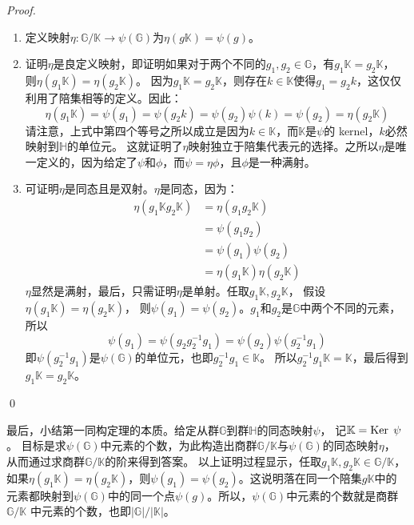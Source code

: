 \begin{proof}
		\begin{enumerate}
		\item 定义映射$\eta\colon \mathbb{G}/\mathbb{K} \to \psi(\mathbb{G})$为$\eta(g \mathbb{K}) = \psi(g)$。
		
		\item 证明$\eta$是良定义映射，即证明如果对于两个不同的$g_1, g_2 \in \mathbb{G}$，有$g_1 \mathbb{K}  =  g_2\mathbb{K} $，
		则$\eta(g_1 \mathbb{K} ) = \eta(g_2 \mathbb{K} )$。
		因为$g_1 \mathbb{K}  =  g_2\mathbb{K}$，则存在$k\in \mathbb{K}$使得$g_1 = g_2 k$，这仅仅利用了陪集相等的定义。因此：
		\[ \eta(g_1\mathbb{K} ) = \psi(g_1) = \psi(g_2 k) = \psi(g_2)\psi(k) = \psi(g_2) =  \eta(g_2\mathbb{K})\]
		请注意，上式中第四个等号之所以成立是因为$k\in \mathbb{K}$，而$\mathbb{K}$是$\psi$的 kernel，$k$必然映射到$\mathbb{H}$的单位元。
		这就证明了$\eta$映射独立于陪集代表元的选择。之所以$\eta$是唯一定义的，因为给定了$\psi$和$\phi$，而$\psi = \eta \phi$，且$\phi$是一种满射。%
		
		\item 可证明$\eta$是同态且是双射。$\eta$是同态，因为：
		\begin{align*}
			\eta(g_1\mathbb{K} g_2 \mathbb{K}) &= \eta(g_1 g_2 \mathbb{K}) \\
			&=  \psi(g_1 g_2) \\
			&= \psi(g_1)\psi(g_2)\\
			&= \eta(g_1\mathbb{K})\eta(g_2\mathbb{K})
			\end{align*}
		$\eta$显然是满射，最后，只需证明$\eta$是单射。任取$g_1\mathbb{K}, g_2\mathbb{K}$，
		假设$\eta(g_1\mathbb{K} ) = \eta(g_2\mathbb{K} )$，
		则$\psi(g_1) = \psi(g_2)$。$g_1$和$g_2$是$\mathbb{G}$中两个不同的元素，所以
		\[\psi(g_1) = \psi(g_2 g_2^{-1} g_1) = \psi(g_2) \psi(g_2^{-1} g_1)\]
		即$\psi(g_2^{-1} g_1)$是$\psi(\mathbb{G})$的单位元，也即$g_2^{-1} g_1 \in \mathbb{K}$。
		所以$g_2^{-1} g_1\mathbb{K} = \mathbb{K} $，最后得到$g_1\mathbb{K} = g_2\mathbb{K}$。
		\end{enumerate} \qed
\end{proof}
最后，小结第一同构定理的本质。给定从群$\mathbb{G}$到群$\mathbb{H}$的同态映射$\psi$，
记$\mathbb{K} = \operatorname{Ker}\; \psi$。
目标是求$\psi(\mathbb{G})$中元素的个数，为此构造出商群$\mathbb{G}/\mathbb{K}$与$\psi(\mathbb{G})$的同态映射$\eta$，
从而通过求商群$\mathbb{G}/\mathbb{K}$的阶来得到答案。
以上证明过程显示，任取$g_1\mathbb{K}, g_2\mathbb{K} \in \mathbb{G}/\mathbb{K}$，
如果$\eta(g_1\mathbb{K} ) = \eta(g_2\mathbb{K} )$，则$\psi(g_1) = \psi(g_2)$。这说明落在同一个陪集$g\mathbb{K}$中的
元素都映射到$\psi(\mathbb{G})$中的同一个点$\psi(g)$。所以，$\psi(\mathbb{G})$中元素的个数就是商群$\mathbb{G}/\mathbb{K}$
中元素的个数，也即$|\mathbb{G}|/|\mathbb{K}|$。

